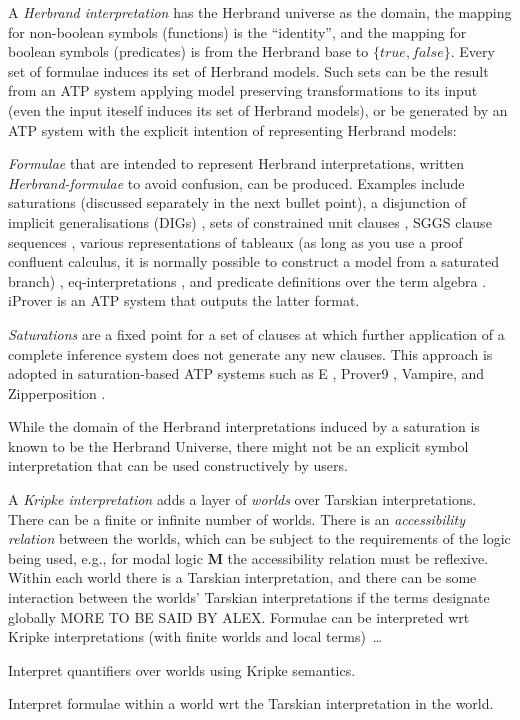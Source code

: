 \documentclass{easychair}
\newenvironment{packed_itemize}{
\vspace*{-0.3em}
\begin{itemize}
\setlength{\partopsep}{0pt}
\setlength{\itemsep}{1pt}
\setlength{\parskip}{0pt}
\setlength{\parsep}{0pt}
}{\end{itemize}}
\begin{document}
\vspace*{0.8em}
A {\em Herbrand interpretation} \cite{Her30} has the Herbrand universe as the domain, the mapping 
for non-boolean symbols (functions) is the ``identity'', and the mapping for boolean symbols 
(predicates) is from the Herbrand base to $\{true,false\}$.
Every set of formulae induces its set of Herbrand models.
Such sets can be the result from an ATP system applying model preserving transformations to its 
input (even the input iteself induces its set of Herbrand models), or be generated by an ATP 
system with the explicit intention of representing Herbrand models:
\begin{packed_itemize}
\item {\em Formulae} that are intended to represent Herbrand interpretations, written 
      {\em Herbrand-formulae} to avoid confusion, can be produced.
      Examples include saturations (discussed separately in the next bullet point), a disjunction 
      of implicit generalisations (DIGs) \cite{LM87}, sets of constrained unit clauses 
      \cite{CZ92,CP95,CP95-TAB}, SGGS clause sequences \cite{BP16}, various representations of 
      tableaux (as long as you use a proof confluent calculus, it is normally possible to construct 
      a model from a saturated branch) \cite{Hah01}, eq-interpretations \cite{Pel03-EQMC}, and 
      predicate definitions over the term algebra \cite{SK12}.
      iProver \cite{Kor08,SK12} is an ATP system that outputs the latter format.
\item {\em Saturations} \cite{BG+01,Pel03-JSC} are a fixed point for a set of clauses at which 
      further application of a complete inference system does not generate any new clauses.
      This approach is adopted in saturation-based ATP systems such as E \cite{SCV19},
      Prover9 \cite{McC-Prover9-URL}, Vampire, and Zipperposition \cite{VB+21}.
\end{packed_itemize}
While the domain of the Herbrand interpretations induced by a saturation is known to be the 
Herbrand Universe, there might not be an explicit symbol interpretation that can be used 
constructively by users.

A {\em Kripke interpretation} \cite{Kri63} adds a layer of {\em worlds} over Tarskian 
interpretations.
There can be a finite or infinite number of worlds.
There is an {\em accessibility relation} between the worlds, which can be subject to the
requirements of the logic being used, e.g., for modal logic {\bf M} the accessibility 
relation must be reflexive.
Within each world there is a Tarskian interpretation, and there can be some interaction
between the worlds' Tarskian interpretations if the terms designate globally MORE TO BE SAID BY
ALEX.
Formulae can be interpreted wrt Kripke interpretations (with finite worlds and local terms)~\ldots
\begin{packed_itemize}
\item Interpret quantifiers over worlds using Kripke semantics.
\item Interpret formulae within a world wrt the Tarskian interpretation in the world.
\end{packed_itemize}
\end{document}
